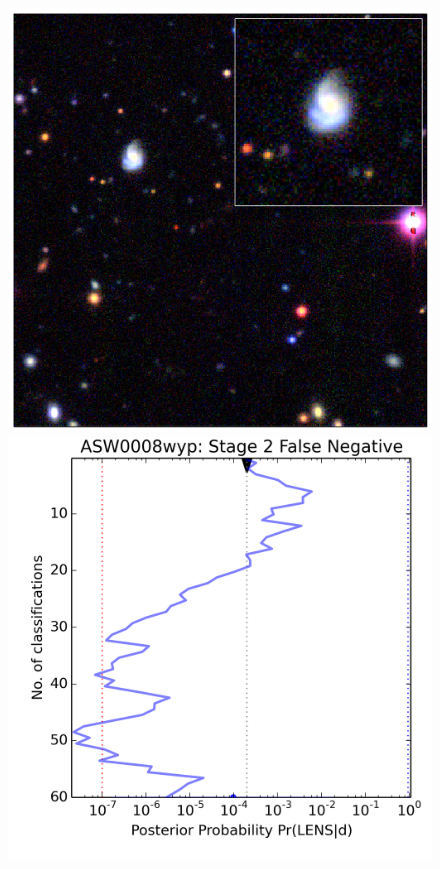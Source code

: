 \documentclass[useAMS,usenatbib,a4paper]{mn2e}
\begin{document}
\begin{figure}
\begin{minipage}{\linewidth}
  \begin{minipage}[t]{0.47\linewidth}
    \begin{minipage}{0.46\linewidth}
      \centering\includegraphics[width=\linewidth]{sw-system-figs/ASW0008wyp_gri.png}
    \end{minipage}\hfill
    \begin{minipage}{0.50\linewidth}
      \centering\includegraphics[width=\linewidth]{sw-system-figs/ASW0008wyp_stage2_trajectory.png}

\end{minipage}
\end{minipage}
\end{minipage}
\end{figure}
\end{document}
